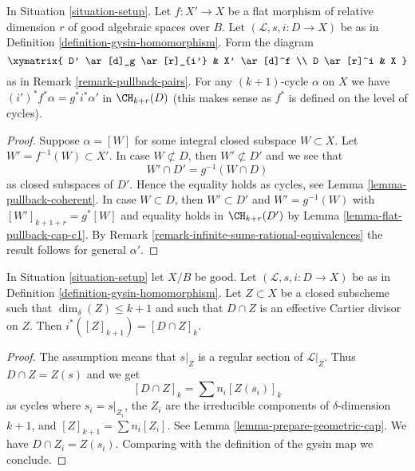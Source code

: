 \begin{lemma}
\label{lemma-gysin-flat-pullback}
In Situation \ref{situation-setup}. Let $f : X' \to X$
be a flat morphism of relative dimension $r$ of
good algebraic spaces over $B$. Let $(\mathcal{L}, s, i : D \to X)$ be as in
Definition \ref{definition-gysin-homomorphism}. Form the diagram
$$
\xymatrix{
D' \ar[d]_g \ar[r]_{i'} & X' \ar[d]^f \\
D \ar[r]^i & X
}
$$
as in Remark \ref{remark-pullback-pairs}.
For any $(k + 1)$-cycle $\alpha$ on $X$ we have
$(i')^*f^*\alpha = g^*i^*\alpha'$ in $\CH_{k + r}(D)$
(this makes sense as $f^*$ is defined on the level of cycles).
\end{lemma}

\begin{proof}
Suppose $\alpha = [W]$ for some integral closed subspace
$W \subset X$. Let $W' = f^{-1}(W) \subset X'$. In case $W \not \subset D$,
then $W' \not \subset D'$ and we see that
$$
W' \cap D' = g^{-1}(W \cap D)
$$
as closed subspaces of $D'$. Hence the
equality holds as cycles, see Lemma \ref{lemma-pullback-coherent}.
In case $W \subset D$, then $W' \subset D'$ and $W' = g^{-1}(W)$
with $[W']_{k + 1 + r} = g^*[W]$ and equality holds in
$\CH_{k + r}(D')$ by Lemma \ref{lemma-flat-pullback-cap-c1}.
By Remark \ref{remark-infinite-sums-rational-equivalences}
the result follows for general $\alpha'$.
\end{proof}

\begin{lemma}
\label{lemma-easy-gysin}
In Situation \ref{situation-setup} let $X/B$ be good.
Let $(\mathcal{L}, s, i : D \to X)$ be as in
Definition \ref{definition-gysin-homomorphism}.
Let $Z \subset X$ be a closed subscheme such
that $\dim_\delta(Z) \leq k + 1$ and such that
$D \cap Z$ is an effective Cartier divisor on $Z$. Then
$i^*([Z]_{k + 1}) = [D \cap Z]_k$.
\end{lemma}

\begin{proof}
The assumption means that $s|_Z$ is a regular section of $\mathcal{L}|_Z$.
Thus $D \cap Z = Z(s)$ and we get
$$
[D \cap Z]_k = \sum n_i [Z(s_i)]_k
$$
as cycles where $s_i = s|_{Z_i}$, the $Z_i$ are the irreducible components
of $\delta$-dimension $k + 1$, and $[Z]_{k + 1} = \sum n_i[Z_i]$.
See Lemma \ref{lemma-prepare-geometric-cap}.
We have $D \cap Z_i = Z(s_i)$. Comparing with the definition
of the gysin map we conclude.
\end{proof}













